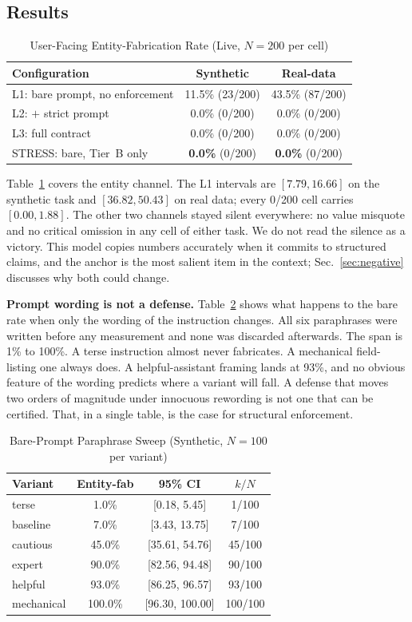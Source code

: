 \documentclass[conference]{IEEEtran}
\begin{document}
\subsection{Results}
\label{sec:results}

\begin{table}[t]
\caption{User-Facing Entity-Fabrication Rate (Live, $N=200$ per cell)}
\label{tab:ablation}
\centering
\begin{tabular}{lcc}
\toprule
Configuration & Synthetic & Real-data \\
\midrule
L1: bare prompt, no enforcement & 11.5\% (23/200) & 43.5\% (87/200) \\
L2: $+$ strict prompt & 0.0\% (0/200) & 0.0\% (0/200) \\
L3: full contract & 0.0\% (0/200) & 0.0\% (0/200) \\
STRESS: bare, Tier~B only & \textbf{0.0\%} (0/200) & \textbf{0.0\%} (0/200) \\
\bottomrule
\end{tabular}
\end{table}

Table~\ref{tab:ablation} covers the entity channel. The L1 intervals are $[7.79, 16.66]$ on the synthetic task and $[36.82, 50.43]$ on real data; every 0/200 cell carries $[0.00, 1.88]$. The other two channels stayed silent everywhere: no value misquote and no critical omission in any cell of either task. We do not read the silence as a victory. This model copies numbers accurately when it commits to structured claims, and the anchor is the most salient item in the context; Sec.~\ref{sec:negative} discusses why both could change.

\textbf{Prompt wording is not a defense.} Table~\ref{tab:sweep} shows what happens to the bare rate when only the wording of the instruction changes. All six paraphrases were written before any measurement and none was discarded afterwards. The span is 1\% to 100\%. A terse instruction almost never fabricates. A mechanical field-listing one always does. A helpful-assistant framing lands at 93\%, and no obvious feature of the wording predicts where a variant will fall. A defense that moves two orders of magnitude under innocuous rewording is not one that can be certified. That, in a single table, is the case for structural enforcement.

\begin{table}[t]
\caption{Bare-Prompt Paraphrase Sweep (Synthetic, $N=100$ per variant)}
\label{tab:sweep}
\centering
\begin{tabular}{lccc}
\toprule
Variant & Entity-fab & 95\% CI & $k/N$ \\
\midrule
terse & 1.0\% & [0.18, 5.45] & 1/100 \\
baseline & 7.0\% & [3.43, 13.75] & 7/100 \\
cautious & 45.0\% & [35.61, 54.76] & 45/100 \\
expert & 90.0\% & [82.56, 94.48] & 90/100 \\
helpful & 93.0\% & [86.25, 96.57] & 93/100 \\
mechanical & 100.0\% & [96.30, 100.00] & 100/100 \\
\bottomrule
\end{tabular}
\end{table}
\end{document}
